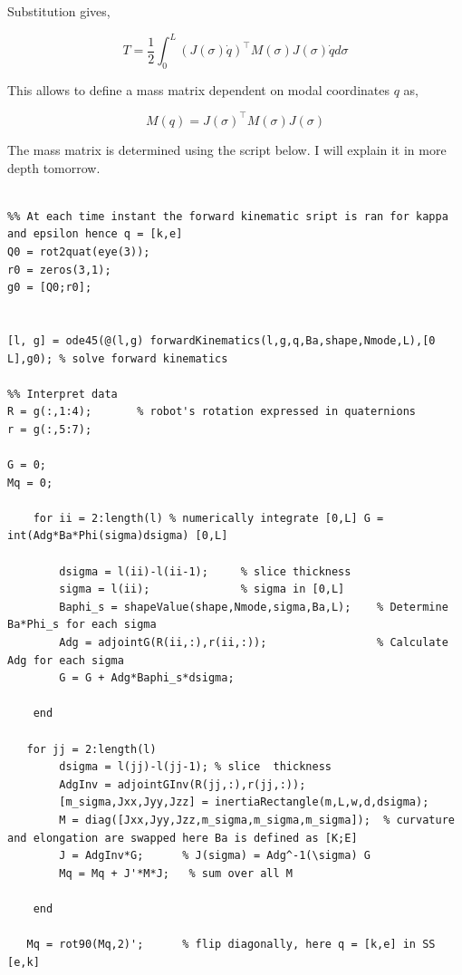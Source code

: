 Substitution gives,

\begin{equation}
    T = \frac{1}{2}\int_0^L (J(\sigma)\dot{q})^\top M(\sigma) J(\sigma)\dot{q} d\sigma
\end{equation}

This allows to define a mass matrix dependent on modal coordinates $q$ as,

\begin{equation}
    M(q) = J(\sigma)^\top M(\sigma) J(\sigma) 
\end{equation}

The mass matrix is determined using the script below. I will explain it in more depth tomorrow.
\newpage

\begin{lstlisting}

%% At each time instant the forward kinematic sript is ran for kappa and epsilon hence q = [k,e]
Q0 = rot2quat(eye(3));
r0 = zeros(3,1);
g0 = [Q0;r0];


[l, g] = ode45(@(l,g) forwardKinematics(l,g,q,Ba,shape,Nmode,L),[0 L],g0); % solve forward kinematics

%% Interpret data
R = g(:,1:4);       % robot's rotation expressed in quaternions
r = g(:,5:7);

G = 0;
Mq = 0;
    
    for ii = 2:length(l) % numerically integrate [0,L] G = int(Adg*Ba*Phi(sigma)dsigma) [0,L]
        
        dsigma = l(ii)-l(ii-1);     % slice thickness
        sigma = l(ii);              % sigma in [0,L]
        Baphi_s = shapeValue(shape,Nmode,sigma,Ba,L);    % Determine Ba*Phi_s for each sigma
        Adg = adjointG(R(ii,:),r(ii,:));                 % Calculate Adg for each sigma   
        G = G + Adg*Baphi_s*dsigma;
        
    end
         
   for jj = 2:length(l)
        dsigma = l(jj)-l(jj-1); % slice  thickness 
        AdgInv = adjointGInv(R(jj,:),r(jj,:)); 
        [m_sigma,Jxx,Jyy,Jzz] = inertiaRectangle(m,L,w,d,dsigma); 
        M = diag([Jxx,Jyy,Jzz,m_sigma,m_sigma,m_sigma]);  % curvature and elongation are swapped here Ba is defined as [K;E]
        J = AdgInv*G;      % J(sigma) = Adg^-1(\sigma) G
        Mq = Mq + J'*M*J;   % sum over all M
  
    end

   Mq = rot90(Mq,2)';      % flip diagonally, here q = [k,e] in SS [e,k]
\end{lstlisting}

